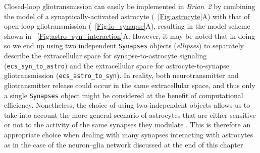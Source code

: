 \documentclass[a4paper, 11pt]{article}
\newcommand{\brian}{\emph{Brian~2}\xspace}
\newcommand*{\figref}[1]{\figurename~\ref{#1}}
\begin{document}
Closed-loop gliotransmission can easily be implemented in \brian by combining the model of a synaptically-activated astrocyte (\figref{Fig:astrocyte}A) with that of open-loop gliotransmission (\figref{Fig:io_synapse}A), resulting in the model scheme shown in \figref{Fig:astro_syn_interaction}A.
However, it may be noted that in doing so we end up using two independent \lstinline|Synapses| objects (\textit{ellipses}) to separately describe the extracellular space for synapse-to-astrocyte signaling (\lstinline|ecs_syn_to_astro|) and the extracellular space for astrocyte-to-synapse gliotransmission (\lstinline|ecs_astro_to_syn|).
In reality, both neurotransmitter and gliotransmitter release could occur in the same extracellular space, and thus only a single \lstinline|Synapses| object might be considered at the benefit of computational efficiency.
Nonetheless, the choice of using two independent objects allows us to take into account the more general scenario of astrocytes that are either sensitive or not  to the activity of the same synapses they modulate \citep{Navarrete_Neuron2010,Martin_Science2015}.
This is therefore an appropriate choice when dealing with many synapses interacting with astrocytes as in the case of the neuron--glia network discussed at the end of this chapter.
\end{document}
